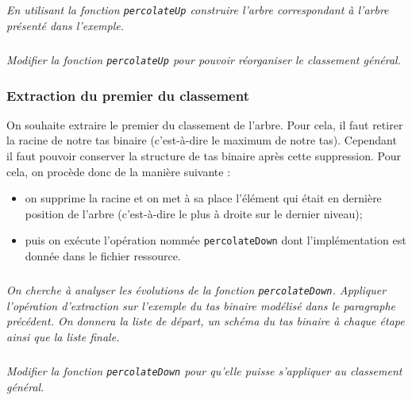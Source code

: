\documentclass[10pt,fleqn]{article} %
\begin{document}
\begin{multicols}{2}
\subparagraph{}
\textit{En utilisant la fonction \texttt{percolateUp} construire l'arbre correspondant à l'arbre présenté dans l'exemple.}

\subparagraph{}
\textit{Modifier la fonction \texttt{percolateUp} pour pouvoir réorganiser le classement général.}


\subsubsection*{Extraction du premier du classement}


On souhaite extraire le premier du classement de l'arbre. Pour cela, il faut retirer la racine de notre tas
binaire (c'est-à-dire le maximum de notre tas). Cependant il faut pouvoir conserver la structure
de tas binaire après cette suppression. Pour cela, on procède donc de la manière suivante :
\begin{itemize}
\item on supprime la racine et on met à sa place l’élément qui était en dernière position de l’arbre
(c'est-à-dire le plus à droite sur le dernier niveau);%
\item puis on exécute l’opération nommée \texttt{percolateDown} dont l’implémentation est donnée dans le fichier ressource.
\end{itemize}


\subparagraph{}
\textit{On cherche à analyser les évolutions de la fonction \texttt{percolateDown}. Appliquer l'opération d'extraction sur l'exemple du tas binaire modélisé dans le paragraphe précédent. On donnera la liste de départ, un schéma du tas binaire à chaque étape ainsi que la liste finale.}


\subparagraph{}
\textit{Modifier la fonction \texttt{percolateDown} pour qu'elle puisse s'appliquer au classement général.}







\end{multicols}
\end{document}
